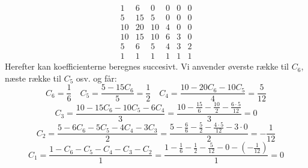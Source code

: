 \begin{equation*}
\begin{array}{r|rrrrr}
1&6&0&0&0&0\\
5&15&5&0&0&0\\
10&20&10&4&0&0\\
10&15&10&6&3&0\\
5&6&5&4&3&2\\
1&1&1&1&1&1
\end{array}
\end{equation*}
Herefter kan koefficienterne beregnes succesivt. Vi anvender øverste række til \(C_6\), næste række til \(C_5\) osv. og får:
\[C_6=\frac{1}{6} \quad C_5=\frac{5-15C_6}{5}=\frac{1}{2} \quad C_4=\frac{10-20C_6-10C_5}{4}=\frac{5}{12}\]
\[C_3=\frac{10-15C_6-10C_5-6C_4}{3}=\frac{10-\frac{15}{6}-\frac{10}{2}-\frac{6 \cdot 5}{12}}{3}=0\]
\[C_2=\frac{5-6C_6-5C_5-4C_4-3C_3}{2}=\frac{5-\frac{6}{6}-\frac{5}{2}-\frac{4 \cdot 5}{12}-3 \cdot 0}{2}=-\frac{1}{12}\]
\[C_1=\frac{1-C_6-C_5-C_4-C_3-C_2}{1}=\frac{1-\frac{1}{6}-\frac{1}{2}-\frac{5}{12}-0-(-\frac{1}{12})}{1}=0\]
